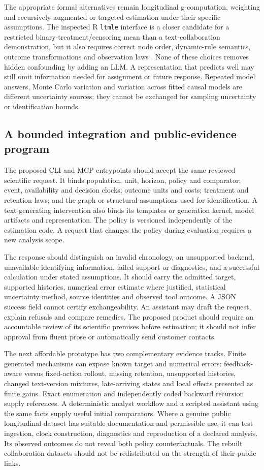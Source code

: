 The appropriate formal alternatives remain longitudinal g-computation,
weighting and recursively augmented or targeted estimation under their
specific assumptions. The inspected R \texttt{ltmle} interface is a
closer candidate for a restricted binary-treatment/censoring mean than
a text-collaboration demonstration, but it also requires correct node
order, dynamic-rule semantics, outcome transformations and observation
laws \citep{sw_ltmle}. None of these choices removes hidden confounding
by adding an LLM. A representation that predicts well may still omit
information needed for assignment or future response. Repeated model
answers, Monte Carlo variation and variation across fitted causal
models are different uncertainty sources; they cannot be exchanged for
sampling uncertainty or identification bounds.

\subsection{A bounded integration and public-evidence program}

The proposed CLI and MCP entrypoints should accept the same reviewed
scientific request. It binds population, unit, horizon, policy and
comparator; event, availability and decision clocks; outcome units and
costs; treatment and retention laws; and the graph or structural
assumptions used for identification. A text-generating intervention also
binds its templates or generation kernel, model artifacts and
representation. The policy is versioned independently of the
estimation code. A request that changes the policy during evaluation
requires a new analysis scope.

The response should distinguish an invalid chronology, an unsupported
backend, unavailable identifying information, failed support or
diagnostics, and a successful calculation under stated assumptions.
It should carry the admitted target, supported histories, numerical
error estimate where justified, statistical uncertainty method, source
identities and observed tool outcome. A JSON success field cannot
certify exchangeability.
An assistant may draft the request, explain refusals and compare remedies.
The proposed product should require an accountable review of its
scientific premises before estimation; it should not infer approval
from fluent prose or automatically send customer contacts.

The next affordable prototype has two complementary evidence tracks.
Finite generated mechanisms can expose known target and numerical
errors: feedback-aware versus fixed-action rollout, missing retention,
unsupported histories, changed text-version mixtures, late-arriving
states and local effects presented as finite gains. Exact enumeration
and independently coded backward recursion supply references. A
deterministic analyst workflow and a scripted assistant using the same
facts supply useful initial comparators. Where a genuine public
longitudinal dataset has suitable documentation and permissible use, it
can test ingestion, clock construction, diagnostics and reproduction
of a declared analysis. Its observed outcomes do not reveal both policy
counterfactuals. The rebuilt collaboration datasets should not be
redistributed on the strength of their public links.

